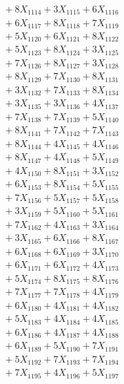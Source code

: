 \documentclass[a4paper,10pt]{article}
\begin{document}
{\begin{align}
&\;  + 8 X_{1114} + 3 X_{1115} + 6 X_{1116} \\[0.3ex]
&\;  + 6 X_{1117} + 8 X_{1118} + 7 X_{1119} \\[0.5ex]\allowbreak
&\;  + 5 X_{1120} + 6 X_{1121} + 8 X_{1122} \\[0.3ex]
&\;  + 5 X_{1123} + 8 X_{1124} + 3 X_{1125} \\[0.3ex]
&\;  + 7 X_{1126} + 8 X_{1127} + 3 X_{1128} \\[0.3ex]
&\;  + 8 X_{1129} + 7 X_{1130} + 8 X_{1131} \\[0.3ex]
&\;  + 3 X_{1132} + 7 X_{1133} + 8 X_{1134} \\[0.3ex]
&\;  + 3 X_{1135} + 3 X_{1136} + 4 X_{1137} \\[0.3ex]
&\;  + 7 X_{1138} + 7 X_{1139} + 5 X_{1140} \\[0.3ex]
&\;  + 8 X_{1141} + 7 X_{1142} + 7 X_{1143} \\[0.3ex]
&\;  + 8 X_{1144} + 4 X_{1145} + 4 X_{1146} \\[0.3ex]
&\;  + 8 X_{1147} + 4 X_{1148} + 5 X_{1149} \\[0.5ex]\allowbreak
&\;  + 4 X_{1150} + 8 X_{1151} + 3 X_{1152} \\[0.3ex]
&\;  + 6 X_{1153} + 8 X_{1154} + 5 X_{1155} \\[0.3ex]
&\;  + 7 X_{1156} + 5 X_{1157} + 5 X_{1158} \\[0.3ex]
&\;  + 3 X_{1159} + 5 X_{1160} + 5 X_{1161} \\[0.3ex]
&\;  + 7 X_{1162} + 4 X_{1163} + 3 X_{1164} \\[0.3ex]
&\;  + 3 X_{1165} + 6 X_{1166} + 8 X_{1167} \\[0.3ex]
&\;  + 6 X_{1168} + 6 X_{1169} + 3 X_{1170} \\[0.3ex]
&\;  + 6 X_{1171} + 6 X_{1172} + 4 X_{1173} \\[0.3ex]
&\;  + 5 X_{1174} + 8 X_{1175} + 8 X_{1176} \\[0.3ex]
&\;  + 7 X_{1177} + 7 X_{1178} + 4 X_{1179} \\[0.5ex]\allowbreak
&\;  + 6 X_{1180} + 4 X_{1181} + 4 X_{1182} \\[0.3ex]
&\;  + 5 X_{1183} + 4 X_{1184} + 4 X_{1185} \\[0.3ex]
&\;  + 6 X_{1186} + 4 X_{1187} + 4 X_{1188} \\[0.3ex]
&\;  + 6 X_{1189} + 5 X_{1190} + 7 X_{1191} \\[0.3ex]
&\;  + 5 X_{1192} + 7 X_{1193} + 7 X_{1194} \\[0.3ex]
&\;  + 7 X_{1195} + 4 X_{1196} + 5 X_{1197} \\[0.3ex]

\end{align}}
\end{document}
